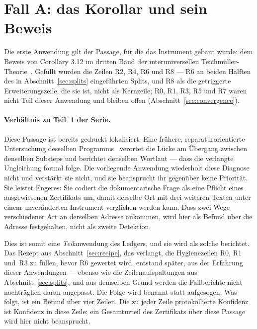 \documentclass[11pt,a4paper]{article}
\theoremstyle{definition}
\begin{document}
\section{Fall A: das Korollar und sein Beweis}
\label{sec:caseA}

Die erste Anwendung gilt der Passage, für die das Instrument gebaut wurde: dem
Beweis von Corollary 3.12 im dritten Band der interuniversellen
Teichmüller-Theorie~\cite{Mochizuki2021c}. Gefüllt wurden die Zeilen R2, R4, R6
und R8 --- R6 an beiden Hälften des in Abschnitt~\ref{sec:splits} eingeführten
Splits, und R8 als die getriggerte Erweiterungszeile, die sie ist, nicht als
Kernzeile; R0, R1, R3, R5 und R7 waren nicht Teil dieser Anwendung und bleiben
offen (Abschnitt~\ref{sec:convergence}).

\paragraph{Verhältnis zu Teil~1 der Serie.} Diese Passage ist bereits gedruckt
lokalisiert. Eine frühere, reparaturorientierte Untersuchung desselben
Programms~\cite{GeigerGap2026} verortet die Lücke am Übergang zwischen denselben
Substeps und berichtet denselben Wortlaut --- dass die verlangte Ungleichung
\glqq formal folge\grqq. Die vorliegende Anwendung wiederholt diese Diagnose nicht und
verstärkt sie nicht, und sie beansprucht ihr gegenüber keine Priorität. Sie leistet
Engeres: Sie codiert die dokumentarische Frage als eine Pflicht eines ausgewiesenen
Zertifikats um, damit derselbe Ort mit drei weiteren Texten unter einem
unveränderten Instrument verglichen werden kann. Dass zwei Wege verschiedener Art
an derselben Adresse ankommen, wird hier als Befund über die Adresse festgehalten,
nicht als zweite Detektion.

Dies ist somit eine \emph{Teil}anwendung des Ledgers, und sie wird als solche
berichtet. Das Rezept aus Abschnitt~\ref{sec:recipe}, das verlangt, die
Hygienezeilen R0, R1 und~R3 zu füllen, bevor R6 gewertet wird, entstand später,
aus der Erfahrung dieser Anwendungen --- ebenso wie die Zeilenaufspaltungen aus
Abschnitt~\ref{sec:splits}, und aus demselben Grund werden die Fallberichte nicht
nachträglich daran angepasst. Die Folge wird benannt statt aufgesogen: Was folgt,
ist ein Befund über vier Zeilen. Die zu jeder Zeile protokollierte Konfidenz ist
Konfidenz in diese Zeile; ein Gesamturteil des Zertifikats über diese Passage wird
hier nicht beansprucht.
\end{document}
